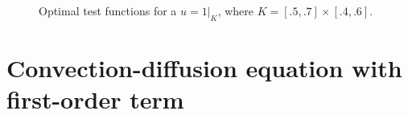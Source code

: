 \begin{figure}
\centering
{}
\caption{Optimal test functions for a $u=\left.1\right|_K$, where $K = [.5,.7]\times[.4,.6]$.}
\end{figure}
\newpage
\section{Convection-diffusion equation with first-order term}


